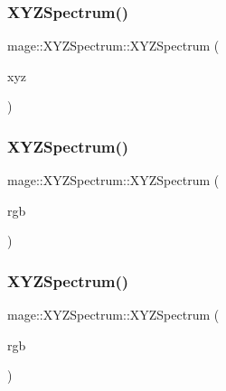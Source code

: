 \hypertarget{structmage_1_1_x_y_z_spectrum_acd737da8e445f137dae3dd886e4e822b}{}\label{structmage_1_1_x_y_z_spectrum_acd737da8e445f137dae3dd886e4e822b} 
\subsubsection{\texorpdfstring{X\+Y\+Z\+Spectrum()}{XYZSpectrum()}\hspace{0.1cm}{\footnotesize\ttfamily [4/8]}}
{\footnotesize\ttfamily mage\+::\+X\+Y\+Z\+Spectrum\+::\+X\+Y\+Z\+Spectrum (\begin{DoxyParamCaption}\item[{\hyperlink{structmage_1_1_x_y_z_spectrum}{X\+Y\+Z\+Spectrum} \&\&}]{xyz }\end{DoxyParamCaption})}

\hypertarget{structmage_1_1_x_y_z_spectrum_a91cf5d611fbad0e47b6718a04b9a505d}{}\label{structmage_1_1_x_y_z_spectrum_a91cf5d611fbad0e47b6718a04b9a505d} 
\subsubsection{\texorpdfstring{X\+Y\+Z\+Spectrum()}{XYZSpectrum()}\hspace{0.1cm}{\footnotesize\ttfamily [5/8]}}
{\footnotesize\ttfamily mage\+::\+X\+Y\+Z\+Spectrum\+::\+X\+Y\+Z\+Spectrum (\begin{DoxyParamCaption}\item[{const \hyperlink{structmage_1_1_r_g_b_spectrum}{R\+G\+B\+Spectrum} \&}]{rgb }\end{DoxyParamCaption})}

\hypertarget{structmage_1_1_x_y_z_spectrum_a0bfea768139190f70cfef880d239b20c}{}\label{structmage_1_1_x_y_z_spectrum_a0bfea768139190f70cfef880d239b20c} 
\subsubsection{\texorpdfstring{X\+Y\+Z\+Spectrum()}{XYZSpectrum()}\hspace{0.1cm}{\footnotesize\ttfamily [6/8]}}
{\footnotesize\ttfamily mage\+::\+X\+Y\+Z\+Spectrum\+::\+X\+Y\+Z\+Spectrum (\begin{DoxyParamCaption}\item[{\hyperlink{structmage_1_1_r_g_b_spectrum}{R\+G\+B\+Spectrum} \&\&}]{rgb }\end{DoxyParamCaption})}


